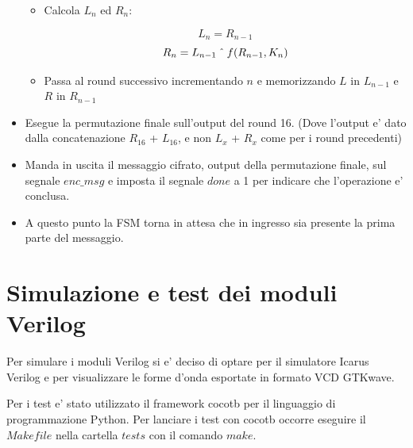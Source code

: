 \documentclass[a4paper]{article}
\newcommand\XOR{\mathbin{\char`\^}}
\begin{document}
\begin{itemize}
\begin{itemize}

            \item Calcola $L_n$ ed $R_n$:

                $$L_n = R_{n-1}$$
                $$R_n = L_{n-1} \XOR f(R_{n-1}, K_n)$$
            \item Passa al round successivo incrementando $n$ e memorizzando $L$ in $L_{n-1}$ e $R$ in $R_{n-1}$
        \end{itemize}

    \item Esegue la permutazione finale sull'output del round 16. (Dove l'output e' dato dalla concatenazione $R_{16}$ + $L_{16}$, e non $L_x$ + $R_x$ come per i round precedenti)
        
    \item Manda in uscita il messaggio cifrato, output della permutazione finale, sul segnale $enc\_msg$ e imposta il segnale $done$ a 1 per indicare che l'operazione e' conclusa.
        

    \item A questo punto la FSM torna in attesa che in ingresso sia presente la prima parte del messaggio.
\end{itemize}

\begin{figure}
    
\end{figure}

\clearpage

\section{Simulazione e test dei moduli Verilog}
Per simulare i moduli Verilog si e' deciso di optare per il simulatore Icarus Verilog e per visualizzare le forme d'onda esportate in formato VCD GTKwave.

Per i test e' stato utilizzato il framework cocotb per il linguaggio di programmazione Python.
Per lanciare i test con cocotb occorre eseguire il $Makefile$ nella cartella $tests$ con il comando $make$.
\end{document}

